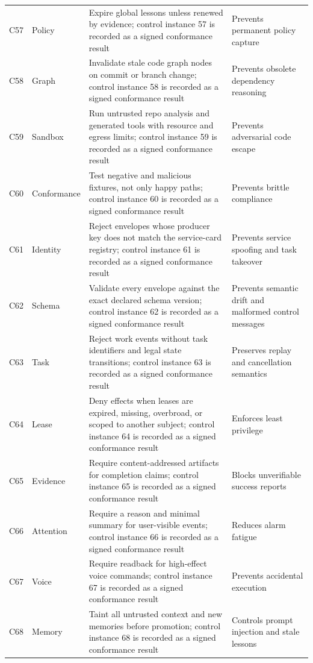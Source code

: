 \documentclass[10pt,journal,onecolumn]{IEEEtran}
\begin{document}
\begin{longtable}{P{0.06\textwidth} P{0.14\textwidth} P{0.48\textwidth} P{0.24\textwidth}}
C57 & Policy & Expire global lessons unless renewed by evidence; control instance 57 is recorded as a signed conformance result & Prevents permanent policy capture \\
C58 & Graph & Invalidate stale code graph nodes on commit or branch change; control instance 58 is recorded as a signed conformance result & Prevents obsolete dependency reasoning \\
C59 & Sandbox & Run untrusted repo analysis and generated tools with resource and egress limits; control instance 59 is recorded as a signed conformance result & Prevents adversarial code escape \\
C60 & Conformance & Test negative and malicious fixtures, not only happy paths; control instance 60 is recorded as a signed conformance result & Prevents brittle compliance \\
C61 & Identity & Reject envelopes whose producer key does not match the service-card registry; control instance 61 is recorded as a signed conformance result & Prevents service spoofing and task takeover \\
C62 & Schema & Validate every envelope against the exact declared schema version; control instance 62 is recorded as a signed conformance result & Prevents semantic drift and malformed control messages \\
C63 & Task & Reject work events without task identifiers and legal state transitions; control instance 63 is recorded as a signed conformance result & Preserves replay and cancellation semantics \\
C64 & Lease & Deny effects when leases are expired, missing, overbroad, or scoped to another subject; control instance 64 is recorded as a signed conformance result & Enforces least privilege \\
C65 & Evidence & Require content-addressed artifacts for completion claims; control instance 65 is recorded as a signed conformance result & Blocks unverifiable success reports \\
C66 & Attention & Require a reason and minimal summary for user-visible events; control instance 66 is recorded as a signed conformance result & Reduces alarm fatigue \\
C67 & Voice & Require readback for high-effect voice commands; control instance 67 is recorded as a signed conformance result & Prevents accidental execution \\
C68 & Memory & Taint all untrusted context and new memories before promotion; control instance 68 is recorded as a signed conformance result & Controls prompt injection and stale lessons \\

\end{longtable}
\end{document}
